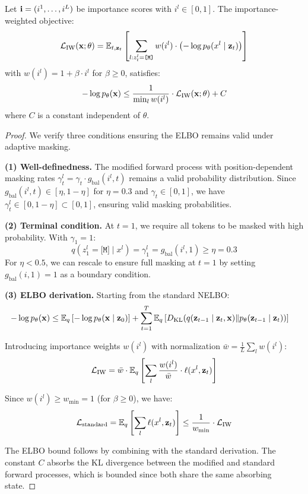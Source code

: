 \begin{theorem}
Let $\mathbf{i} = (i^1, \ldots, i^L)$ be importance scores with $i^l \in [0,1]$. The importance-weighted objective:
\begin{equation}
    \mathcal{L}_{\text{IW}}(\mathbf{x}; \theta) = \mathbb{E}_{t, \mathbf{z}_t}\left[\sum_{l: z^l_t = \texttt{[M]}} w(i^l) \cdot \left(-\log p_\theta(x^l \mid \mathbf{z}_t)\right)\right]
\end{equation}
with $w(i^l) = 1 + \beta \cdot i^l$ for $\beta \geq 0$, satisfies:
\begin{equation}
    -\log p_\theta(\mathbf{x}) \leq \frac{1}{\min_l w(i^l)} \cdot \mathcal{L}_{\text{IW}}(\mathbf{x}; \theta) + C
\end{equation}
where $C$ is a constant independent of $\theta$.
\end{theorem}

\begin{proof}
We verify three conditions ensuring the ELBO remains valid under adaptive masking.

\textbf{(1) Well-definedness.} The modified forward process with position-dependent masking rates $\gamma^l_t = \gamma_t \cdot g_{\text{bal}}(i^l, t)$ remains a valid probability distribution. Since $g_{\text{bal}}(i^l, t) \in [\eta, 1{-}\eta]$ for $\eta = 0.3$ and $\gamma_t \in [0,1]$, we have $\gamma^l_t \in [0, 1{-}\eta] \subset [0,1]$, ensuring valid masking probabilities.

\textbf{(2) Terminal condition.} At $t = 1$, we require all tokens to be masked with high probability. With $\gamma_1 = 1$:
\begin{equation}
    q(z^l_1 = \texttt{[M]} \mid x^l) = \gamma^l_1 = g_{\text{bal}}(i^l, 1) \geq \eta = 0.3
\end{equation}
For $\eta < 0.5$, we can rescale to ensure full masking at $t=1$ by setting $g_{\text{bal}}(i, 1) = 1$ as a boundary condition.

\textbf{(3) ELBO derivation.} Starting from the standard NELBO:
\begin{align}
    -\log p_\theta(\mathbf{x}) &\leq \mathbb{E}_q\left[-\log p_\theta(\mathbf{x} \mid \mathbf{z}_0)\right] + \sum_{t=1}^T \mathbb{E}_q\left[D_{\text{KL}}(q(\mathbf{z}_{t-1} \mid \mathbf{z}_t, \mathbf{x}) \| p_\theta(\mathbf{z}_{t-1} \mid \mathbf{z}_t))\right]
\end{align}

Introducing importance weights $w(i^l)$ with normalization $\bar{w} = \frac{1}{L}\sum_l w(i^l)$:
\begin{equation}
    \mathcal{L}_{\text{IW}} = \bar{w} \cdot \mathbb{E}_q\left[\sum_l \frac{w(i^l)}{\bar{w}} \cdot \ell(x^l, \mathbf{z}_t)\right]
\end{equation}

Since $w(i^l) \geq w_{\min} = 1$ (for $\beta \geq 0$), we have:
\begin{equation}
    \mathcal{L}_{\text{standard}} = \mathbb{E}_q\left[\sum_l \ell(x^l, \mathbf{z}_t)\right] \leq \frac{1}{w_{\min}} \cdot \mathcal{L}_{\text{IW}}
\end{equation}

The ELBO bound follows by combining with the standard derivation. The constant $C$ absorbs the KL divergence between the modified and standard forward processes, which is bounded since both share the same absorbing state.
\end{proof}

